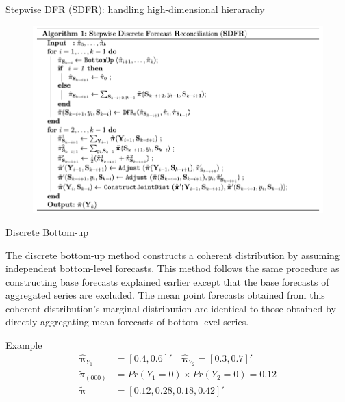 \documentclass[12pt]{beamer}
\begin{document}
\begin{frame}{Stepwise DFR (SDFR): handling high-dimensional hierarachy}
\begin{figure}
\centering
\includegraphics[width=\textwidth]{figures/alg_sdfr.png}
\end{figure}
\end{frame}





\begin{frame}{Discrete Bottom-up}
\begin{outline}
\1 The discrete bottom-up method constructs a coherent distribution by assuming independent bottom-level forecasts. 
\1 This method follows the same procedure as constructing base forecasts explained earlier except that the base forecasts of aggregated series are excluded.
\1 The mean point forecasts obtained from this coherent distribution’s marginal distribution are identical to those obtained by directly aggregating mean forecasts of bottom-level series.

\begin{block}{Example}  
\[
    \begin{aligned}
        \hat{\boldsymbol{\pi}}_{Y_1} &= [0.4, 0.6]'\quad \hat{\boldsymbol{\pi}}_{Y_2} = [0.3, 0.7]' \\
        \tilde{\pi}_{(000)} &= Pr(Y_1=0) \times Pr(Y_2=0) = 0.12      \\
        \tilde{\boldsymbol{\pi}} &= [0.12, 0.28, 0.18, 0.42]'
    \end{aligned}
\]
\end{block}
\end{outline}
\end{frame}
\end{document}

